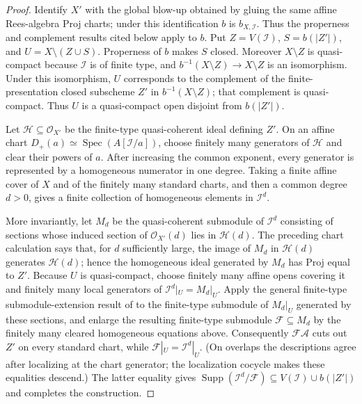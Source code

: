 \begin{proof}
  Identify $X'$ with the global blow-up obtained by gluing the same affine
  Rees-algebra Proj charts; under this identification $b$ is
  $b_{X,\mathcal I}$.  Thus the properness and complement results cited below
  apply to $b$.
  Put $Z=V(\mathcal I)$, $S=b(|Z'|)$, and
  $U=X\setminus(Z\cup S)$.  Properness of $b$ makes $S$ closed.  Moreover
  $X\setminus Z$ is quasi-compact because $\mathcal I$ is of finite type,
  and $b^{-1}(X\setminus Z)\to X\setminus Z$ is an isomorphism.  Under this
  isomorphism, $U$ corresponds to the complement of the finite-presentation
  closed subscheme $Z'$ in $b^{-1}(X\setminus Z)$; that complement is
  quasi-compact.  Thus $U$ is a quasi-compact open disjoint from $b(|Z'|)$.

  Let $\mathcal H\subseteq\mathcal O_{X'}$ be the finite-type
  quasi-coherent ideal defining $Z'$.  On an affine chart
  $D_+(a)\simeq\operatorname{Spec}(A[\mathcal I/a])$, choose finitely many
  generators of $\mathcal H$ and clear their powers of $a$.  After increasing
  the common exponent, every generator is represented by a homogeneous
  numerator in one degree.  Taking a finite affine cover of $X$ and of the
  finitely many standard charts, and then a common degree $d>0$, gives a
  finite collection of homogeneous elements in $\mathcal I^d$.

  More invariantly, let $M_d$ be the quasi-coherent submodule of
  $\mathcal I^d$ consisting of sections whose induced section of
  $\mathcal O_{X'}(d)$ lies in $\mathcal H(d)$.  The preceding chart
  calculation says that, for $d$ sufficiently large, the image of $M_d$ in
  $\mathcal H(d)$ generates $\mathcal H(d)$; hence the homogeneous ideal
  generated by $M_d$ has Proj equal to $Z'$.  Because $U$ is quasi-compact,
  choose finitely many affine opens covering it and finitely many local
  generators of $\mathcal I^d|_U=M_d|_U$.  Apply the general finite-type
  submodule-extension result of
   to the finite-type
  submodule of $M_d|_U$ generated by these sections, and enlarge the resulting
  finite-type submodule $\mathcal F\subseteq M_d$ by the finitely many cleared
  homogeneous equations above.  Consequently
  $\mathcal F\mathcal A$ cuts out $Z'$ on every standard chart, while
  $\mathcal F|_U=\mathcal I^d|_U$.  (On overlaps the descriptions agree after
  localizing at the chart generator; the localization cocycle makes these
  equalities descend.)  The latter equality gives
  $\operatorname{Supp}(\mathcal I^d/\mathcal F)\subseteq
  V(\mathcal I)\cup b(|Z'|)$ and completes the construction.
\end{proof}


